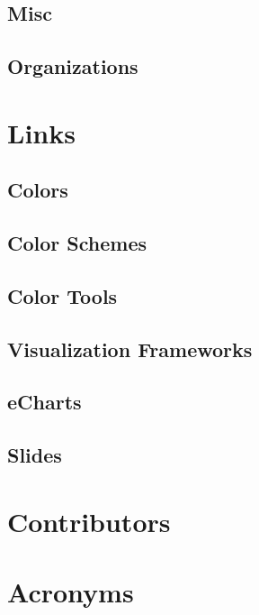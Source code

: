 \documentclass[a4paper,final,notitlepage,makeindex]{article}
\begin{document}
        \subsection{Misc}
            

        \subsection{Organizations}
            

    \section{Links}
        \subsection{Colors}
            
        \subsection{Color Schemes}
            
        \subsection{Color Tools}
            

        \subsection{Visualization Frameworks}
            
        \subsection{eCharts}
            

        \subsection{Slides}
            


    \setlength{\columnseprule}{0.25pt}

    \section{Contributors}
        

    \section{Acronyms}
        \begin{multicols}{2}
            \setlength{\columnseprule}{0pt}
            \footnotesize
            
        \end{multicols}

    \printbibliography[heading=bibintoc]

    \cleardoublepage
    \printindex
\end{document}
